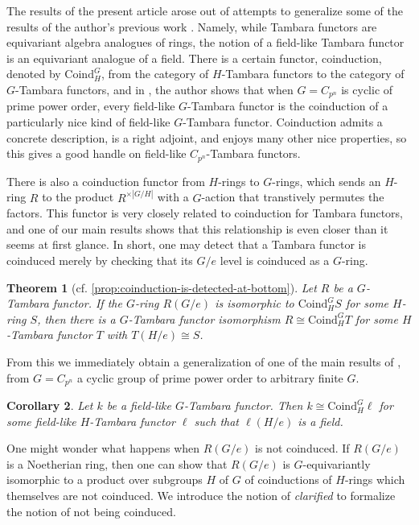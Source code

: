 \documentclass[11pt,dvipsnames]{amsart}
\newtheorem{theoremLET}{Theorem}
\newtheorem{corollaryLET}[theoremLET]{Corollary}
\theoremstyle{BoldRemark}
\begin{document}
The results of the present article arose out of attempts to generalize some of the results of the author's previous work \cite{Wis24}. Namely, while Tambara functors are equivariant algebra analogues of rings, the notion of a field-like Tambara functor \cite{Nak11a} is an equivariant analogue of a field. There is a certain functor, coinduction, denoted by $\mathrm{Coind}_H^G$, from the category of $H$-Tambara functors to the category of $G$-Tambara functors, and in \cite{Wis24}, the author shows that when $G = C_{p^n}$ is cyclic of prime power order, every field-like $G$-Tambara functor is the coinduction of a particularly nice kind of field-like $G$-Tambara functor. Coinduction admits a concrete description, is a right adjoint, and enjoys many other nice properties, so this gives a good handle on field-like $C_{p^n}$-Tambara functors.

There is also a coinduction functor from $H$-rings to $G$-rings, which sends an $H$-ring $R$ to the product $R^{\times |G/H|}$ with a $G$-action that transtively permutes the factors. This functor is very closely related to coinduction for Tambara functors, and one of our main results shows that this relationship is even closer than it seems at first glance. In short, one may detect that a Tambara functor is coinduced merely by checking that its $G/e$ level is coinduced as a $G$-ring.

\begin{theoremLET}[cf. \cref{prop:coinduction-is-detected-at-bottom}]
	Let $R$ be a $G$-Tambara functor. If the $G$-ring $R(G/e)$ is isomorphic to $\mathrm{Coind}_H^G S$ for some $H$-ring $S$, then there is a $G$-Tambara functor isomorphism $R \cong \mathrm{Coind}_H^G T$ for some $H$-Tambara functor $T$ with $T(H/e) \cong S$.
\end{theoremLET}

From this we immediately obtain a generalization of one of the main results of \cite{Wis24}, from $G = C_{p^n}$ a cyclic group of prime power order to arbitrary finite $G$.

\begin{corollaryLET}
	Let $k$ be a field-like $G$-Tambara functor. Then $k \cong \mathrm{Coind}_H^G \ell$ for some field-like $H$-Tambara functor $\ell$ such that $\ell(H/e)$ is a field.
\end{corollaryLET}

One might wonder what happens when $R(G/e)$ is not coinduced. If $R(G/e)$ is a Noetherian ring, then one can show that $R(G/e)$ is $G$-equivariantly isomorphic to a product over subgroups $H$ of $G$ of coinductions of $H$-rings which themselves are not coinduced. We introduce the notion of \emph{clarified} to formalize the notion of not being coinduced.
\end{document}
